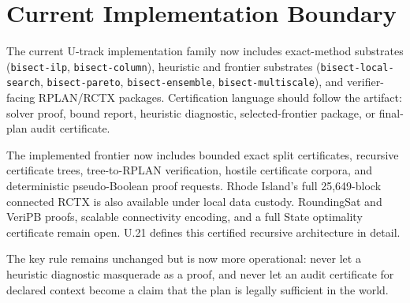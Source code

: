 \section{Current Implementation Boundary}

The current U-track implementation family now includes exact-method substrates
(\texttt{bisect-ilp}, \texttt{bisect-column}), heuristic and frontier substrates
(\texttt{bisect-local-search}, \texttt{bisect-pareto},
\texttt{bisect-ensemble}, \texttt{bisect-multiscale}), and verifier-facing
RPLAN/RCTX packages.  Certification language should follow the artifact:
solver proof, bound report, heuristic diagnostic, selected-frontier package, or
final-plan audit certificate.

The implemented frontier now includes bounded exact split certificates,
recursive certificate trees, tree-to-RPLAN verification, hostile certificate
corpora, and deterministic pseudo-Boolean proof requests. Rhode Island's full
25,649-block connected RCTX is also available under local data custody.
RoundingSat and VeriPB proofs, scalable connectivity encoding, and a full
State optimality certificate remain open. U.21 defines this certified
recursive architecture in detail.

The key rule remains unchanged but is now more operational: never let a
heuristic diagnostic masquerade as a proof, and never let an audit certificate
for declared context become a claim that the plan is legally sufficient in the
world.
